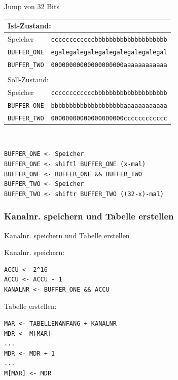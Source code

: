 \documentclass{beamer}
\begin{document}
\begin{frame}[fragile]{Jump von 32 Bits}

{\footnotesize\begin{tabular}{|l|l|}
    \multicolumn{2}{l}{Ist-Zustand:}\\
    \hline
    Speicher   & \texttt{ccccccccccccbbbbbbbbbbbbbbbbbbbb}\\
    \hline
    \texttt{BUFFER\_ONE} & \texttt{egalegalegalegalegalegalegalegal}\\
    \hline
    \texttt{BUFFER\_TWO} & \texttt{00000000000000000000aaaaaaaaaaaa}\\
    \hline
    \multicolumn{2}{l}{}\\
    \multicolumn{2}{l}{Soll-Zustand:}\\
    \hline
    Speicher   & \texttt{ccccccccccccbbbbbbbbbbbbbbbbbbbb}\\
    \hline
    \texttt{BUFFER\_ONE} & \texttt{bbbbbbbbbbbbbbbbbbbbaaaaaaaaaaaa}\\
    \hline
    \texttt{BUFFER\_TWO} & \texttt{00000000000000000000cccccccccccc}\\
    \hline
\end{tabular}\\
\begin{verbatim}
BUFFER_ONE <- Speicher
BUFFER_ONE <- shiftl BUFFER_ONE (x-mal)
BUFFER_ONE <- BUFFER_ONE && BUFFER_TWO
BUFFER_TWO <- Speicher
BUFFER_TWO <- shiftr BUFFER_TWO ((32-x)-mal)
\end{verbatim}}

\end{frame}



\subsubsection{Kanalnr. speichern und Tabelle erstellen}



\begin{frame}[fragile]{Kanalnr. speichern und Tabelle erstellen}
\begin{block}{Kanalnr. speichern:}
{\footnotesize\begin{verbatim}
ACCU <- 2^16
ACCU <- ACCU - 1
KANALNR <- BUFFER_ONE && ACCU
\end{verbatim}}
\end{block}
\begin{block}{Tabelle erstellen:}
{\footnotesize\begin{verbatim}
MAR <- TABELLENANFANG + KANALNR
MDR <- M[MAR]
...
MDR <- MDR + 1
...
M[MAR] <- MDR
\end{verbatim}}
\end{block}
\end{frame}
\end{document}
